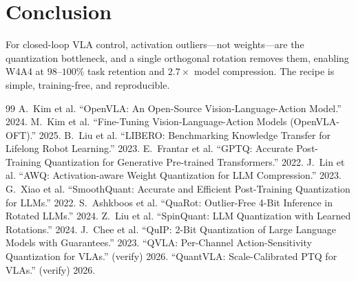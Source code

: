 \documentclass[conference]{IEEEtran}
\begin{document}
\section{Conclusion}
For closed-loop VLA control, activation outliers---not weights---are the quantization
bottleneck, and a single orthogonal rotation removes them, enabling W4A4 at $98$--$100\%$
task retention and $2.7\times$ model compression. The recipe is simple, training-free, and
reproducible.

\begin{thebibliography}{99}
\small
{} A.~Kim et al. ``OpenVLA: An Open-Source Vision-Language-Action Model.'' 2024.
 M.~Kim et al. ``Fine-Tuning Vision-Language-Action Models (OpenVLA-OFT).'' 2025.
 B.~Liu et al. ``LIBERO: Benchmarking Knowledge Transfer for Lifelong Robot Learning.'' 2023.
 E.~Frantar et al. ``GPTQ: Accurate Post-Training Quantization for Generative Pre-trained Transformers.'' 2022.
 J.~Lin et al. ``AWQ: Activation-aware Weight Quantization for LLM Compression.'' 2023.
 G.~Xiao et al. ``SmoothQuant: Accurate and Efficient Post-Training Quantization for LLMs.'' 2022.
 S.~Ashkboos et al. ``QuaRot: Outlier-Free 4-Bit Inference in Rotated LLMs.'' 2024.
 Z.~Liu et al. ``SpinQuant: LLM Quantization with Learned Rotations.'' 2024.
 J.~Chee et al. ``QuIP: 2-Bit Quantization of Large Language Models with Guarantees.'' 2023.
 ``QVLA: Per-Channel Action-Sensitivity Quantization for VLAs.'' (verify) 2026.
 ``QuantVLA: Scale-Calibrated PTQ for VLAs.'' (verify) 2026.
\end{thebibliography}
\end{document}
